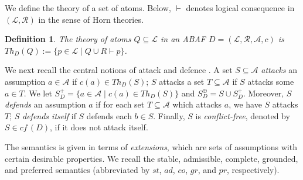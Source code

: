\documentclass[letterpaper]{article} %
\newcommand{\cf}{\textit{cf}\,}
\newcommand{\adm}{\textit{ad}}
\newcommand{\com}{\textit{co}}
\newcommand{\stb}{\textit{st}}
\newcommand{\prf}{\textit{pr}}
\newcommand{\grd}{\textit{gr}}
\newcommand{\asms}{\asm}
\newcommand{\theory}{\mathit{Th}}
\renewcommand{\D}{\ensuremath{\mathcal{D}}}
\newcommand{\lit}{\ensuremath{\mathcal{L}}}
\newcommand{\rules}{\ensuremath{\mathcal{R}}}
\newcommand{\asm}{\ensuremath{\mathcal{A}}}
\newcommand{\atoms}{\mathcal{L}}
\newcommand{\ruleset}{\mathcal{R}}
\newcommand{\assumptions}{\mathcal{A}}
\newcommand{\contra}{c}
\newcommand{\contrary}[1]{c(#1)}
\newcommand{\ABAdef}{D=(\atoms,\ruleset,\assumptions,\contra)}
\newtheorem{definition}[example]{Definition}
\begin{document}
We define the theory of a set of atoms.
Below, $\vdash$ denotes logical consequence in $(\lit,\rules)$ in the sense of Horn theories.
%
\begin{definition}%
    The \emph{theory} of atoms $Q\subseteq \lit$ in an ABAF $\ABAdef$ is $\theory_D(Q):=\{p\in \lit\mid Q\cup R\vdash p\}$.
\end{definition}

 


We next recall the central notions of attack and defence%
. 
A set $S\subseteq \asms$ \emph{attacks} an assumption $a\in \asms$ if  $\contrary{a}\in \theory_D(S)$; $S$ attacks a set $T\subseteq\asm$ if $S$ attacks some $a\in T$. 
We let $S^+_D=\{a\in \asm\mid \contrary{a}\in Th_D(S)\}$ 
and $S^\oplus_D=S\cup S^+_D$.
Moreover, $S$ \emph{defends} an assumption $a$ if for each set $T\subseteq \asms$ which attacks $a$, we have $S$ attacks $T$; $S$ \emph{defends itself} if $S$ defends each $b\in S$. Finally, $S$ is \emph{conflict-free}, denoted by $S\in \cf(D)$, if it does not attack itself. 


The semantics is given in terms of \emph{extensions}, which are sets of assumptions with certain desirable properties. 
We recall the stable, admissible, complete, grounded, and preferred semantics (abbreviated by $\stb$, $\adm$, $\com$, $\grd$, and $\prf$, respectively). 
\end{document}
